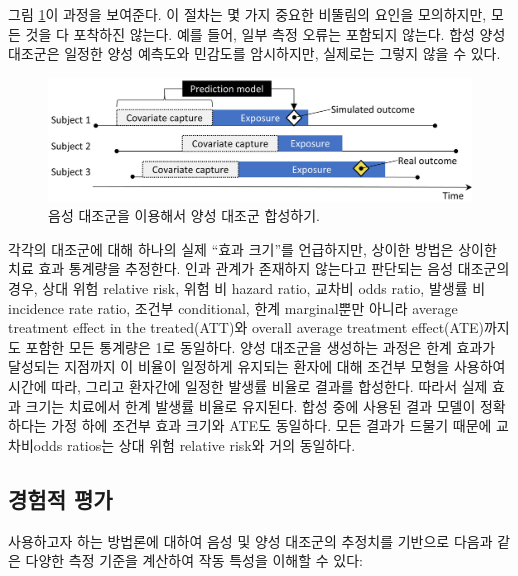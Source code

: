 \documentclass[10.5pt]{book}
\theoremstyle{definition}
\theoremstyle{definition}
\theoremstyle{definition}
\theoremstyle{remark}
\begin{document}
그림 \ref{fig:posControlSynth}이 과정을 보여준다. 이 절차는 몇 가지
중요한 비뚤림의 요인을 모의하지만, 모든 것을 다 포착하진 않는다. 예를
들어, 일부 측정 오류는 포함되지 않는다. 합성 양성 대조군은 일정한 양성
예측도와 민감도를 암시하지만, 실제로는 그렇지 않을 수 있다.

\begin{figure}

{\centering \includegraphics[width=0.9\linewidth]{images/MethodValidity/posControlSynth} 

}

\caption{음성 대조군을 이용해서 양성 대조군 합성하기.}\label{fig:posControlSynth}
\end{figure}

각각의 대조군에 대해 하나의 실제 ``효과 크기''를 언급하지만, 상이한
방법은 상이한 치료 효과 통계량을 추정한다. 인과 관계가 존재하지 않는다고
판단되는 음성 대조군의 경우, 상대 위험 relative risk, 위험 비 hazard
ratio, 교차비 odds ratio, 발생률 비 incidence rate ratio, 조건부
conditional, 한계 marginal뿐만 아니라 average treatment effect in the
treated(ATT)와 overall average treatment effect(ATE)까지도 포함한 모든
통계량은 1로 동일하다. 양성 대조군을 생성하는 과정은 한계 효과가
달성되는 지점까지 이 비율이 일정하게 유지되는 환자에 대해 조건부 모형을
사용하여 시간에 따라, 그리고 환자간에 일정한 발생률 비율로 결과를
합성한다. 따라서 실제 효과 크기는 치료에서 한계 발생률 비율로 유지된다.
합성 중에 사용된 결과 모델이 정확하다는 가정 하에 조건부 효과 크기와
ATE도 동일하다. 모든 결과가 드물기 때문에 교차비odds ratios는 상대 위험
relative risk와 거의 동일하다.

\subsection{경험적 평가}\label{metrics}


사용하고자 하는 방법론에 대하여 음성 및 양성 대조군의 추정치를 기반으로
다음과 같은 다양한 측정 기준을 계산하여 작동 특성을 이해할 수 있다:
\end{document}

